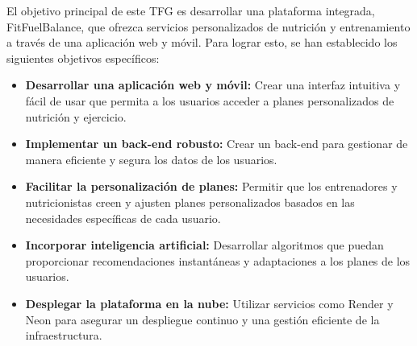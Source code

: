 El objetivo principal de este TFG es desarrollar una plataforma integrada, FitFuelBalance, que ofrezca servicios personalizados de nutrición y entrenamiento a través de una aplicación web y móvil. Para lograr esto, se han establecido los siguientes objetivos específicos:

\begin{itemize}
    \item \textbf{Desarrollar una aplicación web y móvil:} Crear una interfaz intuitiva y fácil de usar que permita a los usuarios acceder a planes personalizados de nutrición y ejercicio.
    \item \textbf{Implementar un back-end robusto:} Crear un back-end para gestionar de manera eficiente y segura los datos de los usuarios.
    \item \textbf{Facilitar la personalización de planes:} Permitir que los entrenadores y nutricionistas creen y ajusten planes personalizados basados en las necesidades específicas de cada usuario.
    \item \textbf{Incorporar inteligencia artificial:} Desarrollar algoritmos que puedan proporcionar recomendaciones instantáneas y adaptaciones a los planes de los usuarios.
    \item \textbf{Desplegar la plataforma en la nube:} Utilizar servicios como Render y Neon para asegurar un despliegue continuo y una gestión eficiente de la infraestructura.
\end{itemize}
